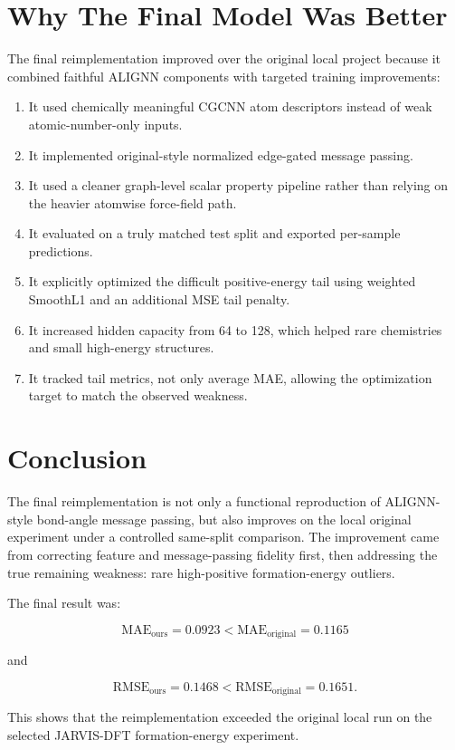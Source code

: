 \documentclass[11pt,a4paper]{article}
\begin{document}
\section{Why The Final Model Was Better}

The final reimplementation improved over the original local project because it combined faithful ALIGNN components with targeted training improvements:

\begin{enumerate}
  \item It used chemically meaningful CGCNN atom descriptors instead of weak atomic-number-only inputs.
  \item It implemented original-style normalized edge-gated message passing.
  \item It used a cleaner graph-level scalar property pipeline rather than relying on the heavier atomwise force-field path.
  \item It evaluated on a truly matched test split and exported per-sample predictions.
  \item It explicitly optimized the difficult positive-energy tail using weighted SmoothL1 and an additional MSE tail penalty.
  \item It increased hidden capacity from 64 to 128, which helped rare chemistries and small high-energy structures.
  \item It tracked tail metrics, not only average MAE, allowing the optimization target to match the observed weakness.
\end{enumerate}

\section{Conclusion}

The final reimplementation is not only a functional reproduction of ALIGNN-style bond-angle message passing, but also improves on the local original experiment under a controlled same-split comparison. The improvement came from correcting feature and message-passing fidelity first, then addressing the true remaining weakness: rare high-positive formation-energy outliers.

The final result was:

\begin{equation}
\text{MAE}_{\text{ours}} = 0.0923 < \text{MAE}_{\text{original}} = 0.1165
\end{equation}

and

\begin{equation}
\text{RMSE}_{\text{ours}} = 0.1468 < \text{RMSE}_{\text{original}} = 0.1651.
\end{equation}

This shows that the reimplementation exceeded the original local run on the selected JARVIS-DFT formation-energy experiment.
\end{document}
